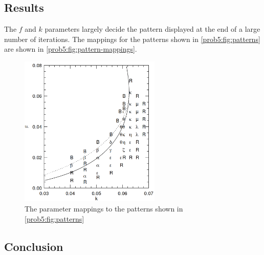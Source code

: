 \subsection{Results}
The $f$ and $k$ parameters largely decide the pattern displayed at the end of a large number of iterations.
The mappings for the patterns shown in \autoref{prob5:fig:patterns} are shown in \autoref{prob5:fig:pattern-mappings}.
\begin{figure}[H]
    \centering
    \includegraphics[width=0.6\textwidth]{figures/reactions/pattern-mappings.png}
    \caption{The parameter mappings to the patterns shown in \autoref{prob5:fig:patterns}}\label{prob5:fig:pattern-mappings}
\end{figure}
\subsection{Conclusion}
